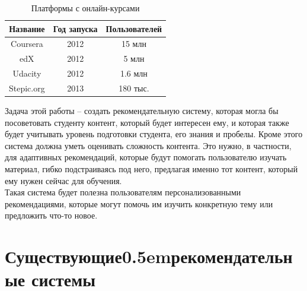 \documentclass[14pt]{matmex-diploma}
\begin{document}
\begin{table}[t]
    \caption{Платформы с онлайн-курсами}
    \label{tabular:mooc_statistic}
    \begin{center}
    \begin{tabular}{c|c|c}
    \hline
    Название & Год запуска & Пользователей \\
    \hline
    \hline
    Coursera\cite{coursera} & 2012 & 15 млн \\
    edX\cite{edx} & 2012 & 5 млн \\
    Udacity\cite{udacity} & 2012 & 1.6 млн \\
    Stepic.org\cite{stepic} & 2013 & 180 тыс. \\
    \hline
    \end{tabular}
    \end{center}
\end{table}

\indent Задача этой работы -- создать рекомендательную систему, которая могла бы посоветовать студенту контент, который будет интересен ему, и которая также будет учитывать уровень подготовки студента, его знания и пробелы. Кроме этого система должна уметь оценивать сложность контента. Это нужно, в частности, для адаптивных рекомендаций, которые будут помогать пользователю изучать материал, гибко подстраиваясь под него, предлагая именно тот контент, который ему нужен сейчас для обучения.
\\\indent Такая система будет полезна пользователям персонализованными рекомендациями, которые могут помочь им изучить конкретную тему или предложить что-то новое.


\section{Существующие{\kern 0.5em}рекомендательные системы}
\end{document}
